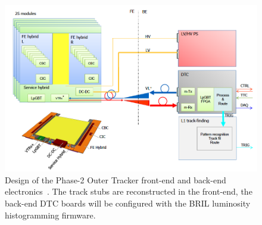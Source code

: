 \begin{figure}[hbtp]
\centering
\includegraphics[width=.85\linewidth]{tex/Part2/fig/OT/OT-DAQoverview.png}
\caption{
  Design of the Phase-2 Outer Tracker front-end and back-end electronics~\cite{CERN-LHCC-2017-009}.
  The track stubs are reconstructed in the front-end, the back-end DTC boards will be configured with the BRIL luminosity histogramming firmware.  
}   
\label{fig:OT_DAQ}
\end{figure}


\clearpage





